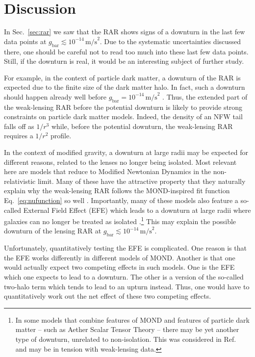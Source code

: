 \documentclass[a4paper,11pt]{article}
\begin{document}
\section{Discussion}
\label{sec:discussion}

In Sec.~\ref{sec:rar} we saw that the RAR shows signs of a downturn in the last few data points at $g_{\mathrm{bar}} \lesssim 10^{-14}\,\mathrm{m/s}^2$.
Due to the systematic uncertainties discussed there, one should be careful not to read too much into these last few data points.
Still, if the downturn is real, it would be an interesting subject of further study.

For example, in the context of particle dark matter, a downturn of the RAR is expected due to the finite size of the dark matter halo.
In fact, such a downturn should happen already well before $g_{\mathrm{bar}} = 10^{-14}\,\mathrm{m/s}^2$ \citep[e.g.][]{Li2022,Mercado2023}.
Thus, the extended part of the weak-lensing RAR before the potential downturn is likely to provide strong constraints on particle dark matter models.
Indeed, the density of an NFW tail falls off as $1/r^3$ while, before the potential downturn, the weak-lensing RAR requires a $1/r^2$ profile.

In the context of modified gravity, a downturn at large radii may be expected for different reasons, related to the lenses no longer being isolated.
Most relevant here are models that reduce to Modified Newtonian Dynamics \citep[MOND,][]{Milgrom1983a,Milgrom1983b,Milgrom1983c} in the non-relativistic limit.
Many of these have the attractive property that they naturally explain why the weak-lensing RAR follows the MOND-inspired fit function Eq.~\eqref{eq:nufunction} so well \citep{Milgrom2013,Famaey2012}.
Importantly, many of these models also feature a so-called External Field Effect (EFE) which leads to a downturn at large radii where galaxies can no longer be treated as isolated \citep{Famaey2012,Chae2022b}.\footnote{
  In some models that combine features of MOND and features of particle dark matter -- such as Aether Scalar  Tensor Theory \citep{Skordis2020} -- there may be yet another type of downturn, unrelated to non-isolation.
  This was considered in Ref.~\cite{Mistele2023} and may be in tension with weak-lensing data.
}
This may explain the possible downturn of the lensing RAR at $g_{\mathrm{bar}} \lesssim 10^{-14}\,\mathrm{m/s}^2$.

Unfortunately, quantitatively testing the EFE is complicated.
One reason is that the EFE works differently in different models of MOND.
Another is that one would actually expect two competing effects in such models.
One is the EFE which one expects to lead to a downturn.
The other is a version of the so-called two-halo term which tends to lead to an upturn instead.
Thus, one would have to quantitatively work out the net effect of these two competing effects.
\end{document}
